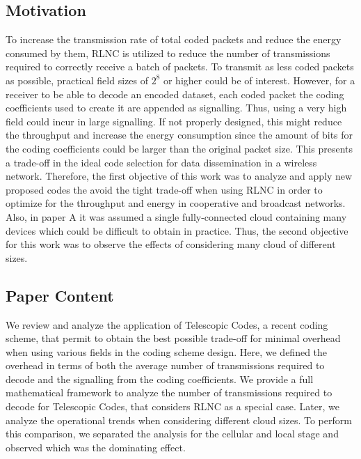 \subsection*{Motivation}
To increase the transmission rate of total coded packets and reduce the energy consumed by them, \ac{RLNC} is utilized to reduce the number of transmissions required to correctly receive a batch of packets. To transmit as less coded packets as possible, practical field sizes of $2^8$ or higher could be of interest. However, for a receiver to be able to decode an encoded dataset, each coded packet the coding coefficients used to create it are appended as signalling. Thus, using a very high field could incur in large signalling. If not properly designed, this might reduce the throughput and increase the energy consumption since the amount of bits for the coding coefficients could be larger than the original packet size. This presents a trade-off in the ideal code selection for data dissemination in a wireless network. Therefore, the first objective of this work was to analyze and apply new proposed codes the avoid the tight trade-off when using \ac{RLNC} in order to optimize for the throughput and energy in cooperative and broadcast networks. Also, in paper A it was assumed a single fully-connected cloud containing many devices which could be difficult to obtain in practice. Thus, the second objective for this work was to observe the effects of considering many cloud of different sizes.

\subsection*{Paper Content}
We review and analyze the application of Telescopic Codes, a recent coding scheme, that permit to obtain the best possible trade-off for minimal overhead when using various fields in the coding scheme design. Here, we defined the overhead in terms of both the average number of transmissions required to decode and the signalling from the coding coefficients. We provide a full mathematical framework to analyze the number of transmissions required to decode for Telescopic Codes, that considers \ac{RLNC} as a special case. Later, we analyze the operational trends when considering different cloud sizes. To perform this comparison, we separated the analysis for the cellular and local stage and observed which was the dominating effect.


